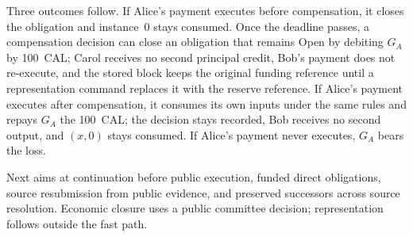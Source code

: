 Three outcomes follow. If Alice's payment executes before compensation, it closes the obligation and instance~0 stays consumed. Once the deadline passes, a compensation decision can close an obligation that remains Open by debiting $G_A$ by 100~CAL; Carol receives no second principal credit, Bob's payment does not re-execute, and the stored block keeps the original funding reference until a representation command replaces it with the reserve reference. If Alice's payment executes after compensation, it consumes its own inputs under the same rules and repays $G_A$ the 100~CAL; the decision stays recorded, Bob receives no second output, and $(x,0)$ stays consumed. If Alice's payment never executes, $G_A$ bears the loss.

Next aims at continuation before public execution, funded direct obligations, source resubmission from public evidence, and preserved successors across source resolution. Economic closure uses a public committee decision; representation follows outside the fast path.
